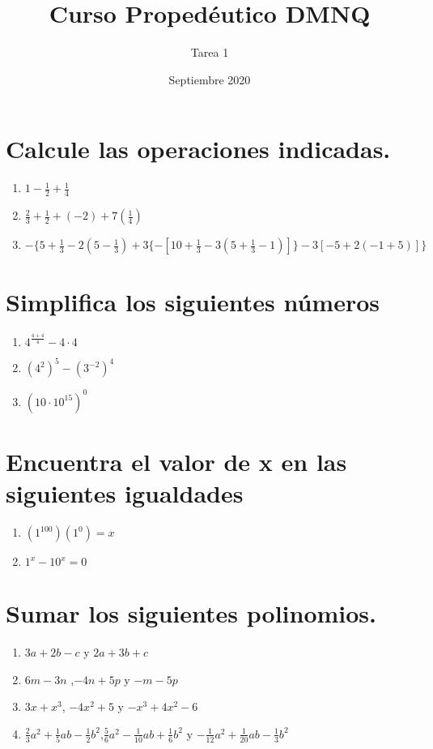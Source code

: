 \documentclass{article}
\title{Curso Propedéutico DMNQ}
\author{Tarea 1}
\date{Septiembre 2020}
\begin{document}
\maketitle

\section*{Calcule las operaciones indicadas.}
\begin{enumerate}
    \item $1-\frac{1}{2}+\frac{1}{4}$
    \item$\frac{2}{3}+\frac{1}{2}+(-2)+7(\frac{1}{4})$
    \item $-\{5+\frac{1}{3}-2(5-\frac{1}{3})+3\{-[10+\frac{1}{3}-3(5+\frac{1}{3}-1)]\}-3[-5+2(-1+5)]\}$
\end{enumerate}

\section*{Simplifica los siguientes números}


\begin{enumerate}
    \item $4^{\frac{4+4}{4}} -4 \cdot4 $
    \item $(4^{2})^{5}-(3^{-2})^{4}$
    \item $(10\cdot10^{15})^0$
\end{enumerate}

\section*{Encuentra el valor de x en las siguientes igualdades}

\begin{enumerate}
    \item $(1^{100})(1^0)=x$
    \item $1^x-10^x=0$
\end{enumerate}

\section*{Sumar los siguientes polinomios.}

\begin{enumerate}
    \item $3a+2b-c$ y $2a + 3b + c$
    \item $6m - 3n$ ,$-4n + 5p$ y $-m - 5p$
    \item $3x + x^3$, $-4x^2 +5$ y $-x^3 + 4x^2 - 6$
    \item $\frac{2}{3}a^2 + \frac{1}{5}ab - \frac{1}{2}b^2$,$\frac{5}{6}a^2 -\frac{1}{10}ab+\frac{1}{6}b^2$ y $-\frac{1}{12}a^2 + \frac{1}{20}ab-\frac{1}{3}b^2$
\end{enumerate}
\end{document}
